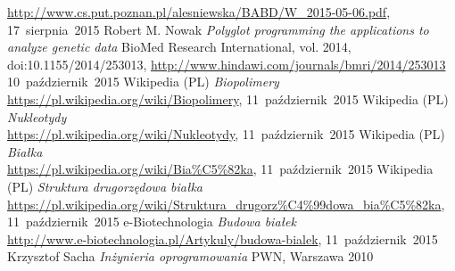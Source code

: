 \documentclass[a4paper,12pt,oneside]{mwrep}  %
\begin{document}
\begin{thebibliography}{99}
\url{http://www.cs.put.poznan.pl/alesniewska/BABD/W_2015-05-06.pdf}, \mbox{17~sierpnia~2015}
 Robert M. Nowak \emph{Polyglot programming the applications to analyze genetic data} BioMed Research International, vol. 2014, doi:10.1155/2014/253013, \url{http://www.hindawi.com/journals/bmri/2014/253013} \mbox{10~październik~2015}
 Wikipedia (PL) \emph{Biopolimery}\\ \url{https://pl.wikipedia.org/wiki/Biopolimery}, \mbox{11~październik~2015}
 Wikipedia (PL) \emph{Nukleotydy}\\ \url{https://pl.wikipedia.org/wiki/Nukleotydy}, \mbox{11~październik~2015}
 Wikipedia (PL) \emph{Białka}\\ \url{https://pl.wikipedia.org/wiki/Bia%C5%82ka}, \mbox{11~październik~2015}
 Wikipedia (PL) \emph{Struktura drugorzędowa białka}\\ \url{https://pl.wikipedia.org/wiki/Struktura_drugorz%C4%99dowa_bia%C5%82ka}, \mbox{11~październik~2015}
 e-Biotechnologia \emph{Budowa białek}\\ \url{http://www.e-biotechnologia.pl/Artykuly/budowa-bialek}, \mbox{11~październik~2015}
 Krzysztof Sacha \emph{Inżynieria oprogramowania} PWN, Warszawa 2010

\end{thebibliography}
\end{document}
